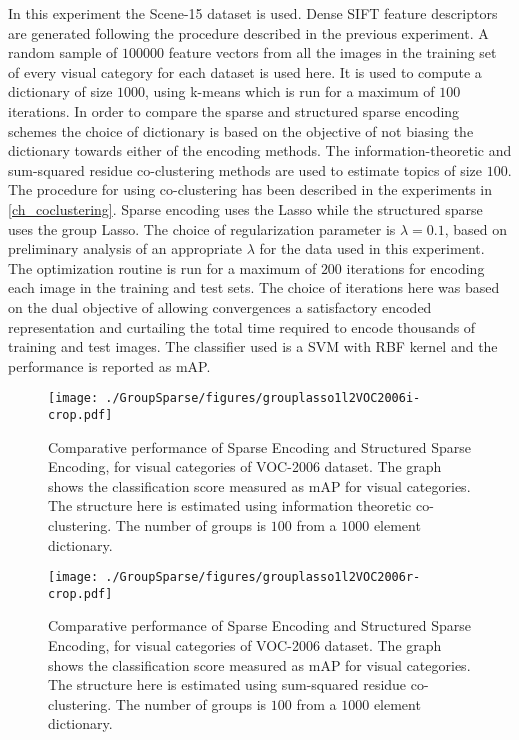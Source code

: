 In this experiment the Scene-15 dataset is used. Dense SIFT feature descriptors are generated following the procedure described in the previous experiment. A random sample of $100000$ feature vectors from all the images in the training set of every visual category for each dataset is used here. It is used to compute a dictionary of size $1000$, using k-means which is run for a maximum of $100$ iterations. In order to compare the sparse and structured sparse encoding schemes the choice of dictionary is based on the objective of not biasing the dictionary towards either of the encoding methods. The information-theoretic and sum-squared residue co-clustering methods are used to estimate topics of size $100$. The procedure for using co-clustering has been described in the experiments in \cref{ch_coclustering}. Sparse encoding uses the Lasso while the structured sparse uses the group Lasso. The choice of regularization parameter is $\lambda = 0.1$, based on preliminary analysis of an appropriate $\lambda$ for the data used in this experiment. The optimization routine is run for a maximum of $200$ iterations for encoding each image in the training and test sets. The choice of iterations here was based on the dual objective of allowing convergences a satisfactory encoded representation and curtailing the total time required to encode thousands of training and test images.  The classifier used is a SVM with RBF kernel and the performance is reported as mAP.

\begin{figure}
 \centering
 \texttt{[image: ./GroupSparse/figures/grouplasso1l2VOC2006i-crop.pdf]}
 \caption[Comparison of sparse and ITCC structured sparse coding using VOC-2006 dataset]{Comparative performance of Sparse Encoding and Structured Sparse Encoding, for visual categories of VOC-2006 dataset. The graph shows the classification score measured as mAP for visual categories. The structure here is estimated using information theoretic co-clustering. The number of groups is $100$ from a $1000$ element dictionary.}
 \label{fig:groupLassoVOC2006i}
\end{figure}

\begin{figure}
 \centering
 \texttt{[image: ./GroupSparse/figures/grouplasso1l2VOC2006r-crop.pdf]}
 \caption[Comparison of sparse and SSRCC structured sparse coding using VOC-2006 dataset]{Comparative performance of Sparse Encoding and Structured Sparse Encoding, for visual categories of VOC-2006 dataset. The graph shows the classification score measured as mAP for visual categories. The structure here is estimated using sum-squared residue co-clustering. The number of groups is $100$ from a $1000$ element dictionary.}
 \label{fig:groupLassoVOC2006r}
\end{figure}

